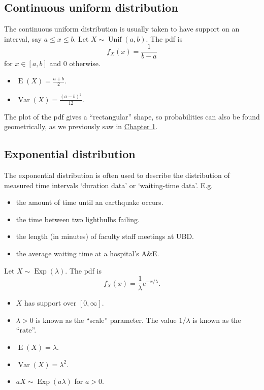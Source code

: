 \documentclass[
]{book}
\providecommand{\tightlist}{%
  \setlength{\itemsep}{0pt}\setlength{\parskip}{0pt}}
\DeclareMathOperator{\E}{E}
\DeclareMathOperator{\Var}{Var}
\DeclareMathOperator{\Exp}{Exp}
\DeclareMathOperator{\Unif}{Unif}
\theoremstyle{definition}
\theoremstyle{definition}
\theoremstyle{definition}
\theoremstyle{definition}
\theoremstyle{remark}
\begin{document}
\hypertarget{continuous-uniform-distribution}{%
\subsection{Continuous uniform distribution}\label{continuous-uniform-distribution}}

The continuous uniform distribution is usually taken to have support on an interval, say \(a \leq x \leq b\). Let \(X\sim\Unif(a,b)\). The pdf is
\[
  f_X(x) = \frac{1}{b-a}
\]
for \(x\in[a,b]\) and 0 otherwise.

\begin{itemize}
\tightlist
\item
  \(\E(X)=\frac{a+b}{2}\).
\item
  \(\Var(X)=\frac{(a-b)^2}{12}\).
\end{itemize}

The plot of the pdf gives a ``rectangular'' shape, so probabilities can also be found geometrically, as we previously saw in \protect\hyperlink{exm:unitsquare}{Chapter 1}.

\hypertarget{exponential-distribution}{%
\subsection{Exponential distribution}\label{exponential-distribution}}

The exponential distribution is often used to describe the distribution of measured time intervals `duration data' or `waiting-time data'. E.g.

\begin{itemize}
\tightlist
\item
  the amount of time until an earthquake occurs.
\item
  the time between two lightbulbs failing.
\item
  the length (in minutes) of faculty staff meetings at UBD.
\item
  the average waiting time at a hospital's A\&E.
\end{itemize}

Let \(X\sim\Exp(\lambda)\).
The pdf is
\[
f_X(x) = \frac{1}{\lambda} e^{-x/\lambda}.
\]

\begin{itemize}
\tightlist
\item
  \(X\) has support over \([0,\infty]\).
\item
  \(\lambda >0\) is known as the ``scale'' parameter. The value \(1/\lambda\) is known as the ``rate''.
\item
  \(\E(X)=\lambda\).
\item
  \(\Var(X)=\lambda^2\).
\item
  \(aX\sim\Exp(a\lambda)\) for \(a>0\).
\end{itemize}
\end{document}
